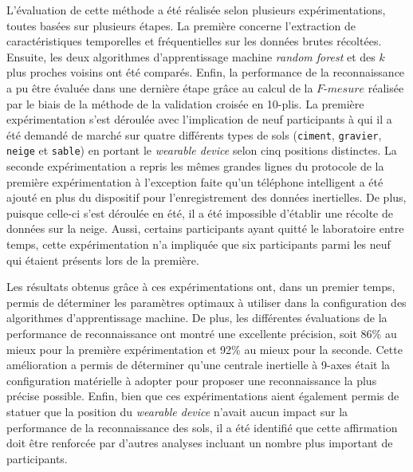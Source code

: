 L'évaluation de cette méthode a été réalisée selon plusieurs expérimentations, toutes basées sur plusieurs étapes. La première concerne l'extraction de caractéristiques temporelles et fréquentielles sur les données brutes récoltées. Ensuite, les deux algorithmes d'apprentissage machine \textit{random forest} et des $k$ plus proches voisins ont été comparés. Enfin, la performance de la reconnaissance a pu être évaluée dans une dernière étape grâce au calcul de la $F\mbox{-} mesure$ réalisée par le biais de la méthode de la validation croisée en 10-plis. La première expérimentation s'est déroulée avec l'implication de neuf participants à qui il a été demandé de marché sur quatre différents types de sols (\texttt{ciment}, \texttt{gravier}, \texttt{neige} et \texttt{sable}) en portant le \textit{wearable device} selon cinq positions distinctes. La seconde expérimentation a repris les mêmes grandes lignes du protocole de la première expérimentation à l'exception faite qu'un téléphone intelligent a été ajouté en plus du dispositif pour l'enregistrement des données inertielles. De plus, puisque celle-ci s'est déroulée en été, il a été impossible d'établir une récolte de données sur la neige. Aussi, certains participants ayant quitté le laboratoire entre temps, cette expérimentation n'a impliquée que six participants parmi les neuf qui étaient présents lors de la première.

Les résultats obtenus grâce à ces expérimentations ont, dans un premier temps, permis de déterminer les paramètres optimaux à utiliser dans la configuration des algorithmes d'apprentissage machine. De plus, les différentes évaluations de la performance de reconnaissance ont montré une excellente précision, soit 86\% au mieux pour la première expérimentation et 92\% au mieux pour la seconde. Cette amélioration a permis de déterminer qu'une centrale inertielle à 9-axes était la configuration matérielle à adopter pour proposer une reconnaissance la plus précise possible. Enfin, bien que ces expérimentations aient également permis de statuer que la position du \textit{wearable device} n'avait aucun impact sur la performance de la reconnaissance des sols, il a été identifié que cette affirmation doit être renforcée par d'autres analyses incluant un nombre plus important de participants.
